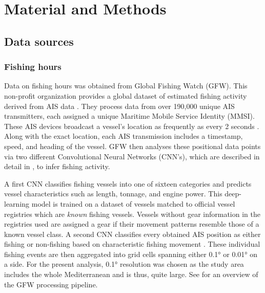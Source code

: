 \chapter{Material and Methods}

\section{Data sources}
\subsection{Fishing hours}
Data on fishing hours was obtained from Global Fishing Watch (GFW). This non-profit organization provides a global dataset of estimated fishing activity
derived from AIS data \citep{gfw_dataset}. 
They process data from over 190,000 unique AIS transmitters, each assigned a unique Maritime Mobile Service Identity (MMSI).
These AIS devices broadcast a vessel's location as frequently as every 2 seconds \citep{kontasvesselupdate, taconet2019global}. Along with the exact location,
each AIS transmission includes a timestamp, speed, and heading of the vessel. GFW then analyses these positional data points via two 
different Convolutional Neural Networks (CNN's), which are described in detail in \cite{Kroodsma18}, to infer fishing activity. 

\bigskip

A first CNN classifies fishing vessels into one of sixteen categories  and 
predicts vessel characteristics such as length, tonnage, and engine power. This deep-learning model is trained on
a dataset of vessels matched to official vessel registries which are \textit{known} fishing vessels. Vessels without
gear information in the registries used are assigned a gear if their movement patterns resemble those of a known
vessel class. A second CNN classifies every obtained AIS position as either fishing or non-fishing based on characteristic fishing movement \citep{Kroodsma18}. 
These individual fishing events are then aggregated into grid cells spanning either 0.1° or 0.01° on a side. For the present analysis, 0.1° resolution was chosen as the study area includes
the whole Mediterranean and is thus, quite large. See  for an overview of the GFW processing pipeline.

\bigskip

